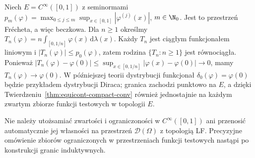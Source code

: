 \begin{przyklad}\label{ex:delta-approx-barrel}
Niech $E=C^\infty([0,1])$ z seminormami
$p_m(\varphi)=\max_{0\le j\le m}\sup_{x\in[0,1]}|\varphi^{(j)}(x)|$,
$m\in\N_0$. Jest to przestrzeń Frécheta, a więc beczkowa.
Dla $n\ge1$ określmy
$T_n(\varphi)=n\int_{[0,1/n]}\varphi(x)\,\mathrm d\lambda(x)$.
Każdy $T_n$ jest ciągłym funkcjonałem liniowym i
$|T_n(\varphi)|\le p_0(\varphi)$, zatem rodzina
$\{T_n:n\ge1\}$ jest równociągła. Ponieważ
$|T_n(\varphi)-\varphi(0)|\le
\sup_{x\in[0,1/n]}|\varphi(x)-\varphi(0)|\to0$,
mamy $T_n(\varphi)\to\varphi(0)$. W późniejszej teorii
dystrybucji funkcjonał $\delta_0(\varphi)=\varphi(0)$
będzie przykładem dystrybucji Diraca; granica zachodzi
punktowo na $E$, a dzięki
Twierdzeniu~\ref{thm:equicont-compact-conv} również
jednostajnie na każdym zwartym zbiorze funkcji testowych
w topologii $E$.
\end{przyklad}

\begin{uwaga}
Nie należy utożsamiać zwartości i ograniczoności w
$C^\infty([0,1])$ ani przenosić automatycznie jej własności
na przestrzeń $\mathcal D(\Omega)$ z topologią LF.
Precyzyjne omówienie zbiorów ograniczonych w przestrzeniach
funkcji testowych nastąpi po konstrukcji granic induktywnych.
\end{uwaga}
